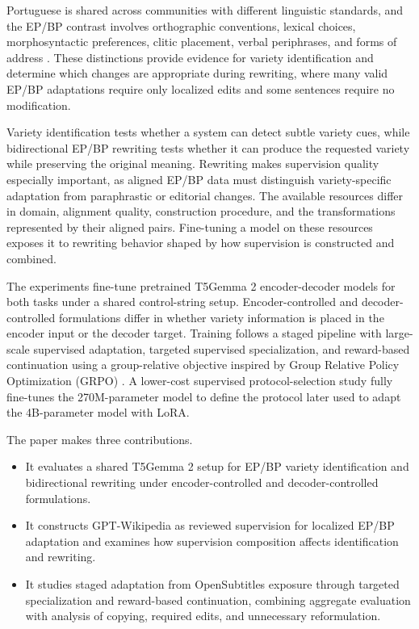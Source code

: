 \documentclass[acmtog,nonacm]{acmart}
\begin{document}
Portuguese is shared across communities with different linguistic standards,
and the EP/BP contrast involves orthographic conventions, lexical choices,
morphosyntactic preferences, clitic placement, verbal periphrases, and forms of
address \citep{barreiro-mota-2018-paraphrastic}. These distinctions provide
evidence for variety identification and determine which changes are appropriate
during rewriting, where many valid EP/BP adaptations require only localized
edits and some sentences require no modification.

Variety identification tests whether a system can detect subtle variety cues,
while bidirectional EP/BP rewriting tests whether it can produce the requested
variety while preserving the original meaning. Rewriting makes supervision
quality especially important, as aligned EP/BP data must distinguish
variety-specific adaptation from paraphrastic or editorial changes. The
available resources differ in domain, alignment quality, construction procedure,
and the transformations represented by their aligned pairs. Fine-tuning a model on these resources exposes it to rewriting behavior shaped
by how supervision is constructed and combined.

The experiments fine-tune pretrained T5Gemma 2 encoder-decoder models for both
tasks under a shared control-string setup. Encoder-controlled and
decoder-controlled formulations differ in whether variety information is placed
in the encoder input or the decoder target. Training follows a staged pipeline
with large-scale supervised adaptation, targeted supervised specialization, and
reward-based continuation using a group-relative objective inspired by Group
Relative Policy Optimization (GRPO)
\citep{shao2024deepseekmathpushinglimitsmathematical}. A lower-cost supervised
protocol-selection study fully fine-tunes the 270M-parameter model to define the
protocol later used to adapt the 4B-parameter model with LoRA.

The paper makes three contributions.
\begin{itemize}
\item It evaluates a shared T5Gemma 2 setup for EP/BP variety identification and bidirectional rewriting under encoder-controlled and decoder-controlled formulations.
\item It constructs GPT-Wikipedia as reviewed supervision for localized EP/BP adaptation and examines how supervision composition affects identification and rewriting.
\item It studies staged adaptation from OpenSubtitles exposure through targeted specialization and reward-based continuation, combining aggregate evaluation with analysis of copying, required edits, and unnecessary reformulation.
\end{itemize}
\end{document}
